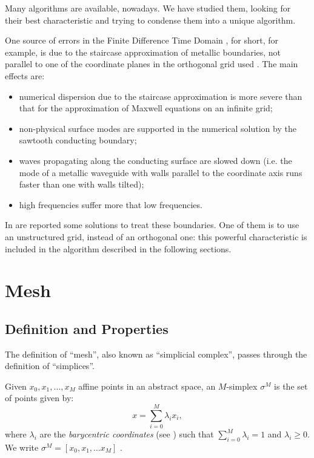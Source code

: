 Many algorithms are available, nowadays. We have studied them, looking
for their best characteristic and trying to condense them into a
unique algorithm.

One source of errors in the Finite Difference Time Domain
\cite{yee_numerical}, \FDTD for short, for example, is due to the
staircase approximation of metallic boundaries, not parallel to one of
the coordinate planes in the orthogonal grid used
\cite{cangellaris_analysis}. The main effects are:
\begin{itemize}
\item
  numerical dispersion due to the staircase approximation is more
  severe than that for the \FDTD approximation of Maxwell equations
  on an infinite grid;
\item
  non-physical surface modes are supported in the numerical solution by
  the sawtooth conducting boundary;
\item
  waves propagating along the conducting surface are slowed down
  (i.e. the mode of a metallic waveguide with walls parallel to the
  coordinate axis runs faster than one with walls tilted);
\item
  high frequencies suffer more that low frequencies.
\end{itemize}

In \cite{cangellaris_analysis} are reported some solutions to treat
these boundaries. One of them is to use an unstructured grid, instead
of an orthogonal one: this powerful characteristic is included in the
algorithm described in the following sections.

\section{Mesh} 

\subsection{Definition and Properties} \label{sec:mesh:def}

The definition of ``mesh'', also known as ``simplicial
complex'', passes
through the definition of ``simplices''.

\begin{definition}[Simplex] \label{def:simplex}
  Given $x_0,x_1,\dotsc,x_M$ affine points in an abstract space, an
  $M$-simplex $\sigma^M$ is the set of points given by:
  \begin{equation*}
    x = \sum_{i=0}^M \lambda_i x_i,
  \end{equation*}
  where $\lambda_i$ are the \emph{barycentric coordinates} (see
  ) such that $\sum_{i=0}^M \lambda_i = 1$ and
  $\lambda_i \ge 0$. We write $\sigma^M = [x_0,x_1,\ldots x_M]$
  \cite{teixeira_geometric}.
\end{definition}

